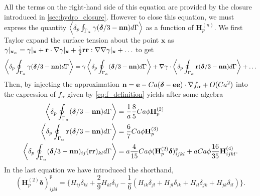 All the terms on the right-hand side of this equation are provided by the closure introduced in \ref{sec:hydro_closure}.
However to close this equation, we must express the quantity $\left<\delta_{p} \oint_{\Gamma_{\alpha}} \gamma (\bm\delta/3 - \textbf{nn}) d\Gamma\right>$ as a function of $\textbf{H}_p^{(n)}$.
We first Taylor expand the surface tension about the point $\textbf{x}$ as $\gamma |_{\textbf{x}_\alpha} = \gamma|_\textbf{x}+\textbf{r}\cdot \mathbf{\nabla} \gamma|_\textbf{x}+\frac{1}{2}\textbf{rr}:\mathbf{\nabla}\mathbf{\nabla}\gamma|_\textbf{x}+\ldots$ to get 
\begin{equation}
\pSavg{\gamma (\bm\delta/3 - \textbf{nn})} = \gamma \pSavg{(\bm\delta/3 - \textbf{nn})} +\grad \gamma \cdot  \pSavg{\textbf{r}(\bm\delta/3 - \textbf{nn})} + \ldots
\label{eq:closure_surface_tension}
\end{equation}
Then, by injecting the approximation $\textbf{n} = \textbf{e} - Ca (\bm\delta - \textbf{e}\textbf{e})\cdot \mathbf{\nabla} f_\alpha + O(Ca^2)$ into the expression of $f_\alpha$ given by \ref{eq:f_definition} yields after some algebra  
\begin{align}
    \pSavg{ (\bm\delta/3 - \textbf{nn})}  
    &=
    \frac{1}{a}\frac{8}{5} Ca \phi \textbf{H}_p^{(2)} \label{eq:closure_surface_tension2}\\
    \pSavg{\textbf{r} (\bm\delta/3 - \textbf{nn})}  
    &=   \frac{6}{7} Ca  \phi \textbf{H}^{(3)}_p
    \label{eq:closure_surface_tension3}\\
    \pSavg{ (\bm\delta/3 - \textbf{nn})_{ij}(\textbf{rr})_{kl}}  
    &= a  \frac{4}{15} Ca \phi
    (\textbf{H}_p^{(2)}\bm\delta)^\text{p}_{ijkl}
    +
    a Ca \phi \frac{16}{35} \textbf{H}^{(4)}_{ijkl}. 
    \label{eq:closure_surface_tension4}
\end{align}
In the last equation we have introduced the shorthand, 
\begin{equation}
    (\textbf{H}_p^{(2)}\bm\delta)^\text{p}_{ijkl}
    =  \{
        H_{ij}\delta_{kl}
        + \frac{2}{9} H_{kl}\delta_{ij}
        - \frac{1}{6} (H_{ik}\delta_{jl}+ H_{jl}\delta_{ik}+H_{il}\delta_{jk}+H_{jk}\delta_{il})
        \}.
\end{equation}
